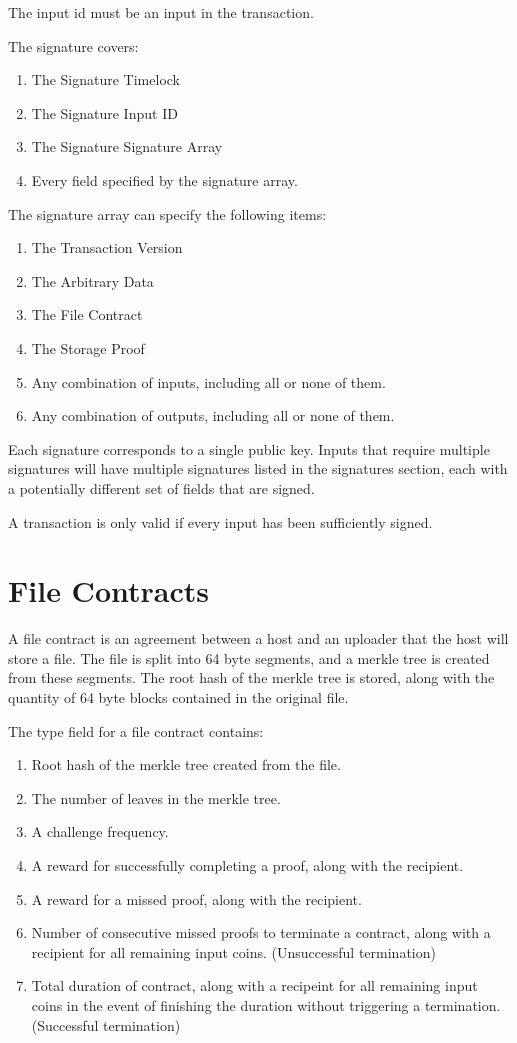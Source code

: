 \documentclass[twocolumn]{article}
\begin{document}
The input id must be an input in the transaction.

The signature covers:
\begin{enumerate}
	\item The Signature Timelock
	\item The Signature Input ID
	\item The Signature Signature Array
	\item Every field specified by the signature array.
\end{enumerate}

The signature array can specify the following items:
\begin{enumerate}
	\item The Transaction Version
	\item The Arbitrary Data
	\item The File Contract
	\item The Storage Proof
	\item Any combination of inputs, including all or none of them.
	\item Any combination of outputs, including all or none of them.
\end{enumerate}

Each signature corresponds to a single public key.
Inputs that require multiple signatures will have multiple signatures listed in the signatures section, each with a potentially different set of fields that are signed.

A transaction is only valid if every input has been sufficiently signed.

\section{File Contracts}
A file contract is an agreement between a host and an uploader that the host will store a file.
The file is split into 64 byte segments, and a merkle tree is created from these segments.
The root hash of the merkle tree is stored, along with the quantity of 64 byte blocks contained in the original file.

The type field for a file contract contains:
\begin{enumerate}
	\item Root hash of the merkle tree created from the file.
	\item The number of leaves in the merkle tree.
	\item A challenge frequency.
	\item A reward for successfully completing a proof, along with the recipient.
	\item A reward for a missed proof, along with the recipient.
	\item Number of consecutive missed proofs to terminate a contract, along with a recipient for all remaining input coins. (Unsuccessful termination)
	\item Total duration of contract, along with a recipeint for all remaining input coins in the event of finishing the duration without triggering a termination. (Successful termination)
\end{enumerate}
\end{document}
